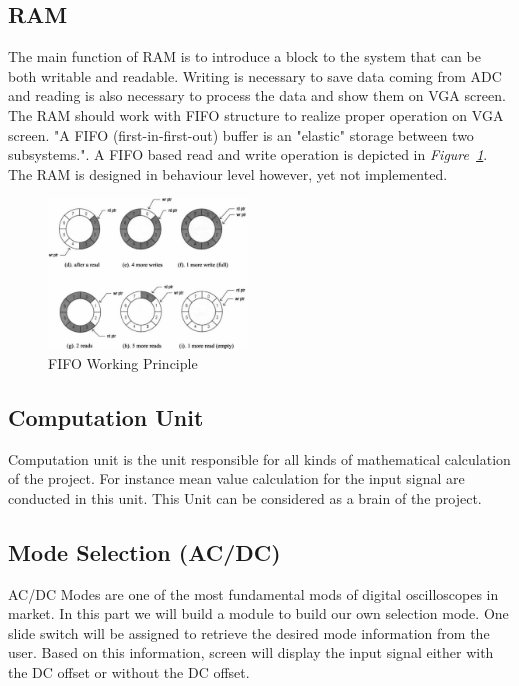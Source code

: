 \documentclass[paper]{IEEEtran}
\begin{document}
\subsection{RAM} \- \indent
	The main function of RAM is to introduce a block to the system that can be both writable and readable. Writing is necessary to save data coming from ADC and reading is also necessary to process the data and show them on VGA screen. The RAM should work with FIFO structure to realize proper operation on VGA screen. "A FIFO (first-in-first-out) buffer is an "elastic" storage between two subsystems."\cite{b3}. A FIFO based read and write operation is depicted in \textit{Figure~\ref{fig:fifo_diagram}}. The RAM is designed in behaviour level however, yet not implemented. 
	\begin{figure}[t!]
		\setlength{\unitlength}{\textwidth}
		\center 
		\includegraphics[width=0.47\textwidth]{fifo_diagram}
		\caption{\label{fig:fifo_diagram}FIFO Working Principle\cite{b3}}
	\end{figure}

\subsection{Computation Unit} \- \indent
	Computation unit is the unit responsible for all kinds of mathematical calculation of the project. For instance mean value calculation for the input signal are conducted in this unit. This Unit can be considered as a brain of the project. 

\subsection{Mode Selection (AC/DC)} \- \indent
	AC/DC Modes are one of the most fundamental mods of digital oscilloscopes in market. In this part we will build a module to build our own selection mode. One slide switch will be assigned to retrieve the desired mode information from the user. Based on this information, screen will display the input signal either with the DC offset or without the DC offset.
\end{document}

